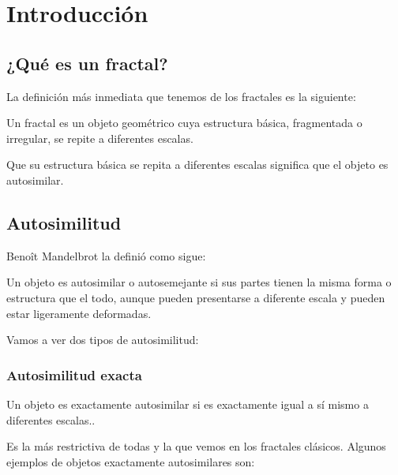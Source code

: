 \chapter{Introducción}

\section{¿Qué es un fractal?}

\noindent La definición más inmediata que tenemos de los fractales es la siguiente:

\begin{definition}
    Un fractal es un objeto geométrico cuya estructura básica, fragmentada o irregular, se repite a diferentes escalas. \cite{Wikipedia_2023}
\end{definition}

\noindent Que su estructura básica se repita a diferentes escalas significa que el objeto es autosimilar.

\section{Autosimilitud}

\noindent Benoît Mandelbrot la definió como sigue:

\begin{definition}
    Un objeto es autosimilar o autosemejante si sus partes tienen la misma forma o estructura que el todo, aunque pueden presentarse a diferente escala y pueden estar ligeramente deformadas. \cite{Wikipedia_2023}
\end{definition}

\noindent
\large Vamos a ver dos tipos de autosimilitud:

\subsection{Autosimilitud exacta}

\begin{definition}
    Un objeto es exactamente autosimilar si es exactamente igual a sí mismo a diferentes escalas.. \cite{Wikipedia_2023}
\end{definition}

\noindent Es la más restrictiva de todas y la que vemos en los fractales clásicos. Algunos ejemplos de objetos exactamente autosimilares son:

